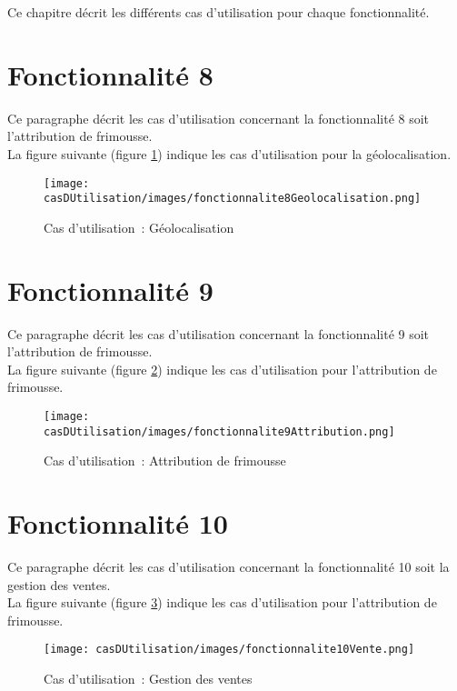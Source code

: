 Ce chapitre décrit les différents cas d'utilisation pour chaque fonctionnalité.


\section{Fonctionnalité 8}
Ce paragraphe décrit les cas d'utilisation concernant la fonctionnalité 8 soit l'attribution de frimousse. \\

La figure suivante (figure \ref{diagrammeCasUtilisation8}) indique les cas d'utilisation pour la géolocalisation.
\begin{figure}[H]
	\centering
	\texttt{[image: casDUtilisation/images/fonctionnalite8Geolocalisation.png]}
	\caption{Cas d'utilisation~: Géolocalisation }
	\label{diagrammeCasUtilisation8}
\end{figure}

\section{Fonctionnalité 9}
Ce paragraphe décrit les cas d'utilisation concernant la fonctionnalité 9 soit l'attribution de frimousse. \\

La figure suivante (figure \ref{diagrammeCasUtilisation9}) indique les cas d'utilisation pour l'attribution de frimousse.
\begin{figure}[H]
	\centering
	\texttt{[image: casDUtilisation/images/fonctionnalite9Attribution.png]}
	\caption{Cas d'utilisation~: Attribution de frimousse }
	\label{diagrammeCasUtilisation9}
\end{figure}

\section{Fonctionnalité 10}
Ce paragraphe décrit les cas d'utilisation concernant la fonctionnalité 10 soit la gestion des ventes. \\

La figure suivante (figure \ref{diagrammeCasUtilisation10}) indique les cas d'utilisation pour l'attribution de frimousse.
\begin{figure}[H]
	\centering
	\texttt{[image: casDUtilisation/images/fonctionnalite10Vente.png]}
	\caption{Cas d'utilisation~: Gestion des ventes }
	\label{diagrammeCasUtilisation10}
\end{figure}
